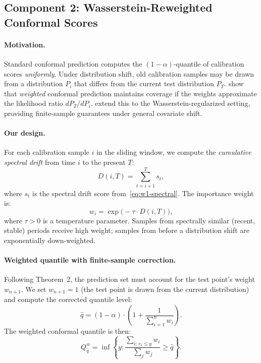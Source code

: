 \subsection{Component 2: Wasserstein-Reweighted Conformal Scores}
\label{sec:wass-reweight}

\paragraph{Motivation.}
Standard conformal prediction computes the $(1-\alpha)$-quantile of
calibration scores \emph{uniformly}.  Under distribution shift, old
calibration samples may be drawn from a distribution $P_i$ that differs
from the current test distribution $P_T$.  \citet{tibshirani2019conformal}
show that \emph{weighted} conformal prediction maintains coverage if the
weights approximate the likelihood ratio $dP_T/dP_i$.
\citet{xu2025wasserstein} extend this to the Wasserstein-regularized
setting, providing finite-sample guarantees under general covariate shift.

\paragraph{Our design.}
For each calibration sample $i$ in the sliding window, we compute the
\emph{cumulative spectral drift} from time $i$ to the present $T$:
\begin{equation}\label{eq:cumulative-drift}
  D(i, T) = \sum_{t=i+1}^{T} s_t,
\end{equation}
where $s_t$ is the spectral drift score from~\eqref{eq:w1-spectral}.
The importance weight is:
\begin{equation}\label{eq:wass-weight}
  w_i = \exp\!\bigl(-\tau \cdot D(i,T)\bigr),
\end{equation}
where $\tau > 0$ is a temperature parameter.  Samples from spectrally
similar (recent, stable) periods receive high weight; samples from before
a distribution shift are exponentially down-weighted.

\paragraph{Weighted quantile with finite-sample correction.}
Following \citet{tibshirani2019conformal} Theorem~2, the prediction set
must account for the test point's weight $w_{n+1}$.  We set $w_{n+1}=1$
(the test point is drawn from the current distribution) and compute the
corrected quantile level:
\begin{equation}\label{eq:q-correction}
  \hat{q} = (1-\alpha)\cdot\left(1 + \frac{1}{\sum_{i=1}^{n} w_i}\right).
\end{equation}
The weighted conformal quantile is then:
\begin{equation}
  Q_{\hat{q}}^{w} = \inf\!\left\{y :
    \frac{\sum_{i:\, e_i \le y} w_i}{\sum_{j} w_j} \ge \hat{q}
  \right\}.
\end{equation}

